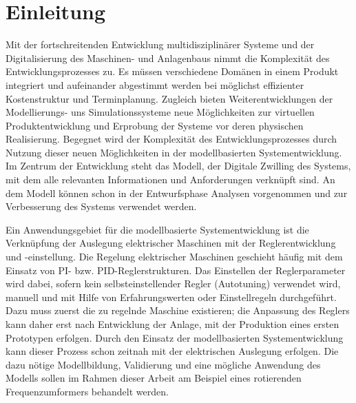 \chapter{Einleitung}
\label{chap:Einleitung}
Mit der fortschreitenden Entwicklung multidisziplinärer Systeme und der Digitalisierung des Maschinen- und Anlagenbaus nimmt die Komplexität des Entwicklungsprozesses zu. Es müssen verschiedene Domänen in einem Produkt integriert und aufeinander abgestimmt werden bei möglichst effizienter Kostenstruktur und Terminplanung. Zugleich bieten Weiterentwicklungen der Modellierungs- uns Simulationssysteme neue Möglichkeiten zur virtuellen Produktentwicklung und Erprobung der Systeme vor deren physischen Realisierung. Begegnet wird der Komplexität des Entwicklungsprozesses durch Nutzung dieser neuen Möglichkeiten in der modellbasierten Systementwicklung. Im Zentrum der Entwicklung steht das Modell, der Digitale Zwilling des Systems, mit dem alle relevanten Informationen und Anforderungen verknüpft sind. An dem Modell können schon in der Entwurfsphase Analysen vorgenommen und zur Verbesserung des Systems verwendet werden. 

Ein Anwendungsgebiet für die modellbasierte Systementwicklung ist die Verknüpfung der Auslegung elektrischer Maschinen mit der Reglerentwicklung und -einstellung. Die Regelung elektrischer Maschinen geschieht häufig mit dem Einsatz von PI- bzw. PID-Reglerstrukturen. Das Einstellen der Reglerparameter wird dabei, sofern kein selbsteinstellender Regler
(Autotuning) verwendet wird, manuell und mit Hilfe von Erfahrungswerten oder Einstellregeln durchgeführt. Dazu muss zuerst die zu regelnde Maschine existieren; die Anpassung des Reglers kann daher erst nach Entwicklung der Anlage, mit der Produktion eines ersten Prototypen erfolgen. Durch den Einsatz der modellbasierten Systementwicklung kann dieser Prozess schon zeitnah mit der elektrischen Auslegung erfolgen. Die dazu nötige Modellbildung, Validierung und eine mögliche Anwendung des Modells sollen im Rahmen dieser Arbeit am Beispiel eines rotierenden Frequenzumformers behandelt werden.

